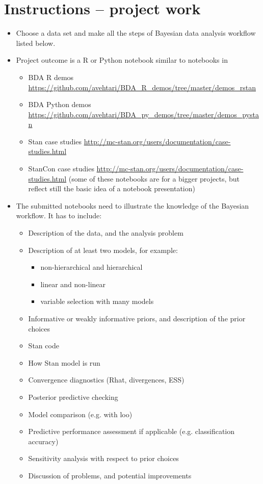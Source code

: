 \documentclass[a4paper,11pt]{article}
\begin{document}
\thispagestyle{empty}

\section*{Instructions -- project work}
\begin{itemize}[noitemsep,topsep=0pt]
\item Choose a data set and make all the steps of Bayesian data
  analysis workflow listed below.
\item Project outcome is a R or Python notebook similar to notebooks in
\begin{itemize}[noitemsep,topsep=0pt]
  \item BDA R demos \url{https://github.com/avehtari/BDA_R_demos/tree/master/demos_rstan}
  \item BDA Python demos \url{https://github.com/avehtari/BDA_py_demos/tree/master/demos_pystan}
  \item Stan case studies \url{http://mc-stan.org/users/documentation/case-studies.html}
  \item StanCon case studies \url{http://mc-stan.org/users/documentation/case-studies.html}
  (some of these notebooks are for a bigger projects, but reflect still the basic idea of a notebook presentation)
\end{itemize}
\item The submitted notebooks need to illustrate the knowledge of the
  Bayesian workflow. It has to include:
\begin{itemize}
  \item Description of the data, and the analysis problem
  \item Description of at least two models, for example:
    \begin{itemize}
    \item non-hierarchical and hierarchical
    \item linear and non-linear
    \item variable selection with many models
    \end{itemize}
  \item Informative or weakly informative priors, and description of the prior choices
  \item Stan code
  \item How Stan model is run
  \item Convergence diagnostics (Rhat, divergences, ESS)
  \item Posterior predictive checking
  \item Model comparison (e.g. with loo)
  \item Predictive performance assessment if applicable
    (e.g. classification accuracy)
  \item Sensitivity analysis with respect to prior choices
  \item Discussion of problems, and potential improvements 
\end{itemize}


\end{itemize}
\end{document}
